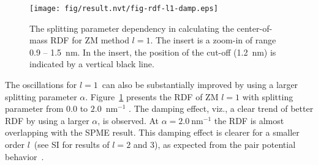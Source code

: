 \documentclass[a4paper,preprint,unsortedaddress,onecolumn,fleqn]{revtex4}
\begin{document}
\begin{figure}[tbp]
\centering
\texttt{[image: fig/result.nvt/fig-rdf-l1-damp.eps]}
\caption{ The splitting parameter dependency in calculating the
center-of-mass RDF for ZM method $l=1$. The insert is a zoom-in of range 0.9
-- 1.5~nm. In the insert, the position of the cut-off (1.2~nm) is indicated
by a vertical black line. }
\label{fig:rdf-damp}
\end{figure}

The oscillations for $l=1$\ can also be substantially improved by using a
larger splitting parameter $\alpha $. Figure~\ref{fig:rdf-damp} presents the
RDF of ZM $l=1$ with splitting parameter from $0.0$ to $2.0$~$\text{nm}^{-1}$%
. The damping effect, viz., a clear trend of better RDF by using a larger $%
\alpha $, is observed. At $\alpha =2.0\ \text{nm}^{-1}$ the RDF is almost
overlapping with the SPME result. This damping effect is clearer for a
smaller order $l$\ (see SI for results of {$l=2$ and $3$}), as expected from
the pair potential behavior~\cite{fukuda2014zero}.




\end{document}
